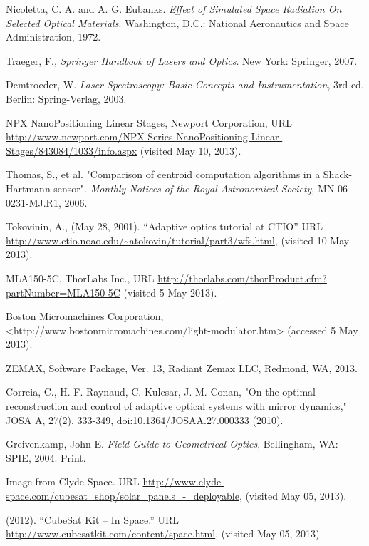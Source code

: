 \documentclass[12pt]{article}
\begin{document}
\begin{thebibliography}{9}
   Nicoletta, C. A. and A. G. Eubanks.
   \emph{Effect of Simulated Space Radiation On Selected Optical
     Materials}. Washington, D.C.: National Aeronautics and Space
   Administration, 1972.

   Traeger, F., \emph{Springer Handbook of Lasers and Optics}. New
   York: Springer, 2007.

   Demtroeder, W.
   \emph{Laser Spectroscopy: Basic Concepts and Instrumentation}, 3rd
   ed. Berlin: Spring-Verlag, 2003.

   NPX NanoPositioning Linear Stages, Newport Corporation,
   URL \url{http://www.newport.com/NPX-Series-NanoPositioning-Linear-Stages/843084/1033/info.aspx}
   (visited May 10, 2013).

Thomas, S., et al. "Comparison of centroid computation algorithms in a Shack-Hartmann sensor". \emph{Monthly Notices of the Royal Astronomical Society}, MN-06-0231-MJ.R1, 2006.

   Tokovinin, A., (May 28, 2001). ``Adaptive optics tutorial at CTIO'' URL
   \url{http://www.ctio.noao.edu/~atokovin/tutorial/part3/wfs.html}, 
   (visited 10 May 2013).

   MLA150-5C, ThorLabs Inc.,
   URL \url{http://thorlabs.com/thorProduct.cfm?partNumber=MLA150-5C}
   (visited 5 May 2013).

Boston Micromachines Corporation, <http://www.bostonmicromachines.com/light-modulator.htm> (accessed 5 May 2013).

   ZEMAX, Software Package, Ver. 13, Radiant Zemax LLC, Redmond, WA, 2013.

  Correia, C., H.-F. Raynaud, C. Kulcsar, J.-M. Conan, "On the optimal reconstruction and control of adaptive optical systems with mirror dynamics," JOSA A, 27(2), 333-349, doi:10.1364/JOSAA.27.000333 (2010).

   Greivenkamp, John E. 
   \emph{Field Guide to Geometrical Optics}, Bellingham, WA: SPIE, 2004. Print.



Image from Clyde Space.  URL \url{http://www.clyde-space.com/cubesat_shop/solar_panels_-_deployable}, (visited May 05, 2013).

 (2012).  ``CubeSat Kit -- In Space.''  URL \url{http://www.cubesatkit.com/content/space.html}, (visited May 05, 2013).


\end{thebibliography}
\end{document}
